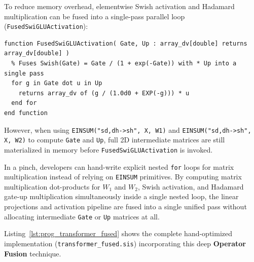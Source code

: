 To reduce memory overhead, elementwise Swish activation and Hadamard multiplication can be fused into a single-pass parallel loop (\texttt{FusedSwiGLUActivation}):

\begin{lstlisting}[caption={Single-Pass Swish Activation \& Hadamard Product Fusion}]
function FusedSwiGLUActivation( Gate, Up : array_dv[double] returns array_dv[double] )
  % Fuses Swish(Gate) = Gate / (1 + exp(-Gate)) with * Up into a single pass
  for g in Gate dot u in Up
    returns array_dv of (g / (1.0d0 + EXP(-g))) * u
  end for
end function
\end{lstlisting}

However, when using \texttt{EINSUM("sd,dh->sh", X, W1)} and \texttt{EINSUM("sd,dh->sh", X, W2)} to compute \texttt{Gate} and \texttt{Up}, full 2D intermediate matrices are still materialized in memory before \texttt{FusedSwiGLUActivation} is invoked.

In a pinch, developers can hand-write explicit nested \texttt{for} loops for matrix multiplication instead of relying on \texttt{EINSUM} primitives. By computing matrix multiplication dot-products for $W_1$ and $W_2$, Swish activation, and Hadamard gate-up multiplication simultaneously inside a single nested loop, the linear projections and activation pipeline are fused into a single unified pass without allocating intermediate \texttt{Gate} or \texttt{Up} matrices at all.

Listing~\ref{lst:prog_transformer_fused} shows the complete hand-optimized implementation (\texttt{transformer\_fused.sis}) incorporating this deep \textbf{Operator Fusion} technique.

